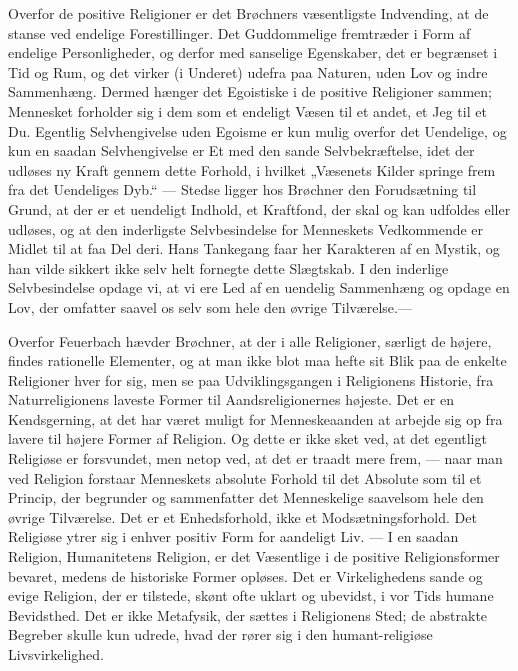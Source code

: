 \documentclass[12pt,a4paper,openany]{book}
\newcommand{\opage}[1]{\marginnote{\footnotesize\textit{[#1]}}}
\begin{document}
Overfor de positive Religioner er det Brøchners væsentligste Indvending, at de
stanse ved endelige Forestillinger. Det Guddommelige fremtræder i Form af
endelige Personligheder, og derfor med sanselige Egenskaber, det er begrænset i
Tid og Rum, og det virker (i Underet) udefra paa Naturen, uden Lov og indre
Sammenhæng. Dermed hænger det Egoistiske i de positive Religioner sammen;
Mennesket forholder sig i dem som et endeligt Væsen til et andet, et Jeg til et
Du. Egentlig Selvhengivelse uden Egoisme er kun mulig overfor det Uendelige, og
kun en saadan Selvhengivelse er Et med
\setcounter{footnote}{0}%
\opage{205}den sande Selvbekræftelse, idet der udløses ny Kraft gennem dette
Forhold, i hvilket „Væsenets Kilder springe frem fra det Uendeliges Dyb.“ ---
Stedse ligger hos Brøchner den Forudsætning til Grund, at der er et uendeligt
Indhold, et Kraftfond, der skal og kan udfoldes eller udløses, og at den
inderligste Selvbesindelse for Menneskets Vedkommende er Midlet til at faa Del
deri. Hans Tankegang faar her Karakteren af en Mystik, og han vilde sikkert
ikke selv helt fornegte dette Slægtskab. I den inderlige Selvbesindelse opdage
vi, at vi ere Led af en uendelig Sammenhæng og opdage en Lov, der omfatter
saavel os selv som hele den øvrige Tilværelse.---

Overfor Feuerbach hævder Brøchner, at der i alle Religioner, særligt de højere,
findes rationelle Elementer, og at man ikke blot maa hefte sit Blik paa de
enkelte Religioner hver for sig, men se paa Udviklingsgangen i Religionens
Historie, fra Naturreligionens laveste Former til Aandsreligionernes højeste.
Det er en Kendsgerning, at det har været muligt for Menneskeaanden at arbejde
sig op fra lavere til højere Former af Religion. Og dette er ikke sket ved, at
det egentligt Religiøse er forsvundet, men netop ved, at det er traadt mere
frem, --- naar man ved Religion forstaar Menneskets absolute Forhold til det
Absolute som til et Princip, der begrunder og sammenfatter det Menneskelige
saavelsom hele den øvrige Tilværelse. Det er et Enhedsforhold, ikke et
Modsætningsforhold. Det Religiøse ytrer sig i enhver positiv Form for aandeligt
Liv. --- I en saadan Religion, Humanitetens Religion, er det Væsentlige i de
positive Religionsformer bevaret, medens de historiske Former opløses. Det er
Virkelighedens sande og evige Religion, der er tilstede, skønt ofte uklart og
ubevidst, i vor Tids humane Bevidsthed. Det er ikke Metafysik, der sættes i
Religionens Sted; de abstrakte Begreber skulle kun udrede, hvad der rører sig i
den humant-religiøse Livsvirkelighed.
\end{document}

